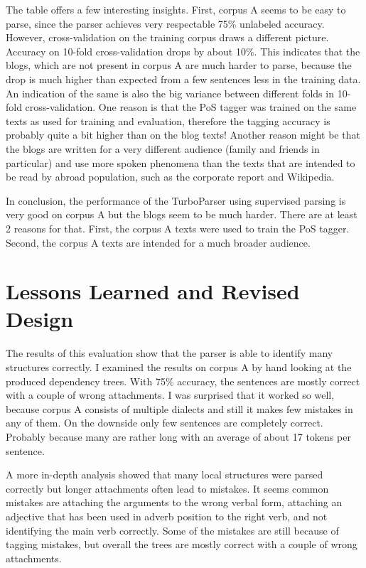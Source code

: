 \documentclass[11pt,letterpaper, covington]{article}
\begin{document}
The table offers a few interesting insights. First, corpus A seems to be easy to parse, since the parser achieves very respectable 75\% unlabeled accuracy. However, cross-validation on the training corpus draws a different picture. Accuracy on 10-fold cross-validation drops by about 10\%. This indicates that the blogs, which are not present in corpus A are much harder to parse, because the drop is much higher than expected from a few sentences less in the training data. An indication of the same is also the big variance between different folds in 10-fold cross-validation. One reason is that the PoS tagger was trained on the same texts as used for training and evaluation, therefore the tagging accuracy is probably quite a bit higher than on the blog texts! Another reason might be that the blogs are written for a very different audience (family and friends in particular) and use more spoken phenomena than the texts that are intended to be read by abroad population, such as the corporate report and Wikipedia.

In conclusion, the performance of the TurboParser using supervised parsing is very good on corpus A but the blogs seem to be much harder. There are at least 2 reasons for that. First, the corpus A texts were used to train the PoS tagger. Second, the corpus A texts are intended for a much broader audience. 

\section{Lessons Learned and Revised Design}

The results of this evaluation show that the parser is able to identify many structures correctly. I examined the results on corpus A by hand looking at the produced dependency trees. With 75\% accuracy, the sentences are mostly correct with a couple of wrong attachments. I was surprised that it worked so well, because corpus A consists of multiple dialects and still it makes few mistakes in any of them. On the downside only few sentences are completely correct. Probably because many are rather long with an average of about 17 tokens per sentence. 

A more in-depth analysis showed that many local structures were parsed correctly but longer attachments often lead to mistakes. It seems common mistakes are attaching the arguments to the wrong verbal form, attaching an adjective that has been used in adverb position to the right verb, and not identifying the main verb correctly. Some of the mistakes are still because of tagging mistakes, but overall the trees are mostly correct with a couple of wrong attachments. 
\end{document}
